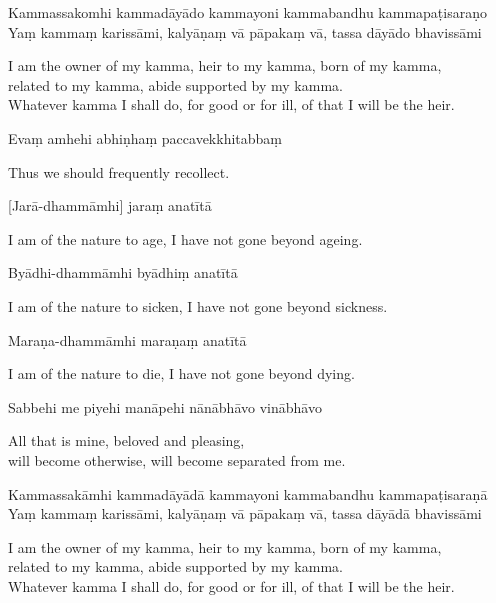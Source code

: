 Kammassakomhi kammadāyādo kammayoni kammabandhu kammapaṭisaraṇo\\
Yaṃ kammaṃ karissāmi, kalyāṇaṃ vā pāpakaṃ vā, tassa dāyādo bhavissāmi

\begin{english}
  I am the owner of my kamma, heir to my kamma, born of my kamma,\\
  related to my kamma, abide supported by my kamma.\\
  Whatever kamma I shall do, for good or for ill, of that I will be the heir.
\end{english}

Evaṃ amhehi abhiṇhaṃ paccavekkhitabbaṃ

\begin{english}
  Thus we should frequently recollect.
\end{english}


[Jarā-dhammāmhi] jaraṃ anatītā

\begin{english}
  I am of the nature to age, I have not gone beyond ageing.
\end{english}

Byādhi-dhammāmhi byādhiṃ anatītā

\begin{english}
  I am of the nature to sicken, I have not gone beyond sickness.
\end{english}

Maraṇa-dhammāmhi maraṇaṃ anatītā

\begin{english}
  I am of the nature to die, I have not gone beyond dying.
\end{english}

Sabbehi me piyehi manāpehi nānābhāvo vinābhāvo

\begin{english}
  All that is mine, beloved and pleasing,\\
  will become otherwise, will become separated from me.
\end{english}

Kammassakāmhi kammadāyādā kammayoni kammabandhu kammapaṭisaraṇā\\
Yaṃ kammaṃ karissāmi, kalyāṇaṃ vā pāpakaṃ vā, tassa dāyādā bhavissāmi

\begin{english}
  I am the owner of my kamma, heir to my kamma, born of my kamma,\\
  related to my kamma, abide supported by my kamma.\\
  Whatever kamma I shall do, for good or for ill, of that I will be the heir.
\end{english}

